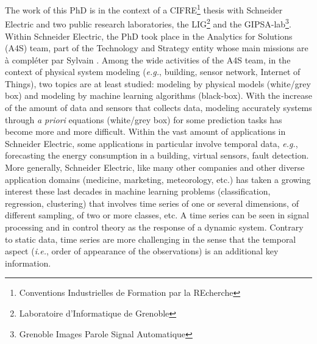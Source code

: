 The work of this PhD is in the context of a CIFRE\footnote[1]{Conventions Industrielles de Formation par la REcherche} thesis with Schneider Electric and two public research laboratories, the LIG\footnote[2]{Laboratoire d'Informatique de Grenoble} and the GIPSA-lab\footnote[3]{Grenoble Images Parole Signal Automatique}. Within Schneider Electric, the PhD took place in the Analytics for Solutions (A4S) team, part of the Technology and Strategy entity whose main missions are {\color{red}à compléter par Sylvain} . Among the wide activities of the A4S team, in the context of physical system modeling (\textit{e.g.}, building, sensor network, Internet of Things), two topics are at least studied: modeling by physical models (white/grey box) and modeling by machine learning algorithms (black-box). With the increase of the amount of data and sensors that collects data, modeling accurately systems through \textit{a priori} equations (white/grey box) for some prediction tasks has become more and more difficult. Within the vast amount of applications in Schneider Electric, some applications in particular involve temporal data, \textit{e.g.}, forecasting the energy consumption in a building, virtual sensors, fault detection. More generally, Schneider Electric, like many other companies and other diverse application domains (medicine, marketing, meteorology, etc.) has taken a growing interest these last decades in machine learning problems (classification, regression, clustering) that involves time series of one or several dimensions, of different sampling, of two or more classes, etc. A time series can be seen in signal processing and in control theory as the response of a dynamic system. Contrary to static data, time series are more challenging in the sense that the temporal aspect (\textit{i.e.}, order of appearance of the observations) is an additional key information. \\

